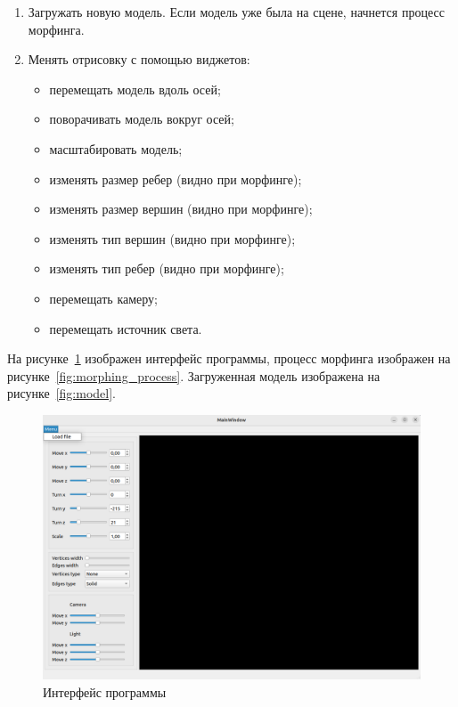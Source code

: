 \begin{enumerate}
	\item Загружать новую модель.
	Если модель уже была на сцене, начнется процесс морфинга.
	\item Менять отрисовку с помощью виджетов:
	
	\begin{itemize}
		\item перемещать модель вдоль осей;
		\item поворачивать модель вокруг осей;
		\item масштабировать модель;
		\item изменять размер ребер (видно при морфинге);
		\item изменять размер вершин (видно при морфинге);
		\item изменять тип вершин (видно при морфинге);
		\item изменять тип ребер (видно при морфинге);
		\item перемещать камеру;
		\item перемещать источник света.
	\end{itemize}
\end{enumerate}

На рисунке~\ref{fig:interface} изображен интерфейс программы, процесс морфинга изображен на рисунке~\ref{fig:morphing_process}.
Загруженная модель изображена на рисунке~\ref{fig:model}.


\begin{figure}[h]
	\centering
	\includegraphics[scale=0.54]{images/interface_programm.png}
	\caption{Интерфейс программы}
	\label{fig:interface}
\end{figure}

